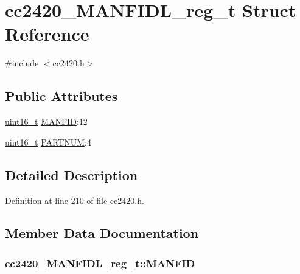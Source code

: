 \hypertarget{structcc2420___m_a_n_f_i_d_l__reg__t}{}\section{cc2420\+\_\+\+M\+A\+N\+F\+I\+D\+L\+\_\+reg\+\_\+t Struct Reference}
\label{structcc2420___m_a_n_f_i_d_l__reg__t}


{\ttfamily \#include $<$cc2420.\+h$>$}

\subsection*{Public Attributes}
\begin{DoxyCompactItemize}
\item 
\hyperlink{_p_e___types_8h_a1f1825b69244eb3ad2c7165ddc99c956}{uint16\+\_\+t} \hyperlink{structcc2420___m_a_n_f_i_d_l__reg__t_a717b43722be80eda10189fa772b7eef5}{M\+A\+N\+F\+ID}\+:12
\item 
\hyperlink{_p_e___types_8h_a1f1825b69244eb3ad2c7165ddc99c956}{uint16\+\_\+t} \hyperlink{structcc2420___m_a_n_f_i_d_l__reg__t_a3a3ac97a3720ff1192cbac0be1a9a8c7}{P\+A\+R\+T\+N\+UM}\+:4
\end{DoxyCompactItemize}


\subsection{Detailed Description}


Definition at line 210 of file cc2420.\+h.



\subsection{Member Data Documentation}
\subsubsection[{\texorpdfstring{M\+A\+N\+F\+ID}{MANFID}}]{ cc2420\+\_\+\+M\+A\+N\+F\+I\+D\+L\+\_\+reg\+\_\+t\+::\+M\+A\+N\+F\+ID}\hypertarget{structcc2420___m_a_n_f_i_d_l__reg__t_a717b43722be80eda10189fa772b7eef5}{}\label{structcc2420___m_a_n_f_i_d_l__reg__t_a717b43722be80eda10189fa772b7eef5}


